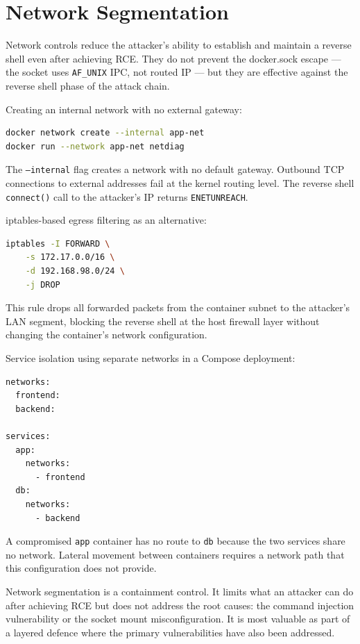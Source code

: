 
\section{Network Segmentation}

Network controls reduce the attacker's ability to establish and maintain a reverse shell even after achieving RCE. They do not prevent the docker.sock escape --- the socket uses \texttt{AF\_UNIX} IPC, not routed IP --- but they are effective against the reverse shell phase of the attack chain.

Creating an internal network with no external gateway:

\begin{lstlisting}[language=bash]
docker network create --internal app-net
docker run --network app-net netdiag
\end{lstlisting}

The \texttt{--internal} flag creates a network with no default gateway. Outbound TCP connections to external addresses fail at the kernel routing level. The reverse shell \texttt{connect()} call to the attacker's IP returns \texttt{ENETUNREACH}.

iptables-based egress filtering as an alternative:

\begin{lstlisting}[language=bash]
iptables -I FORWARD \
    -s 172.17.0.0/16 \
    -d 192.168.98.0/24 \
    -j DROP
\end{lstlisting}

This rule drops all forwarded packets from the container subnet to the attacker's LAN segment, blocking the reverse shell at the host firewall layer without changing the container's network configuration.

Service isolation using separate networks in a Compose deployment:

\begin{lstlisting}
networks:
  frontend:
  backend:

services:
  app:
    networks:
      - frontend
  db:
    networks:
      - backend
\end{lstlisting}

A compromised \texttt{app} container has no route to \texttt{db} because the two services share no network. Lateral movement between containers requires a network path that this configuration does not provide.

Network segmentation is a containment control. It limits what an attacker can do after achieving RCE but does not address the root causes: the command injection vulnerability or the socket mount misconfiguration. It is most valuable as part of a layered defence where the primary vulnerabilities have also been addressed.
